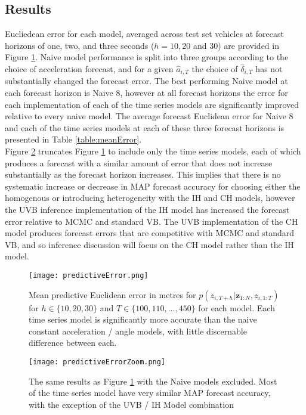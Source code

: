 \documentclass[12pt,a4paper]{article}\usepackage[]{graphicx}\usepackage[]{color}
\begin{document}
\subsection{Results}
\label{subsec:Results}

Eucliedean error for each model, averaged across test set vehicles at forecast horizons of one, two, and three seconds ($h = 10, 20$ and $30$) are provided in Figure \ref{fig:PredError}. Naive model performance is split into three groups according to the choice of acceleration forecast, and for a given $\hat{a}_{i, T}$ the choice of $\hat{\delta}_{i, T}$ has not substantially changed the forecast error. The best performing Naive model at each forecast horizon is Naive 8, however at all forecast horizons the error for each implementation of each of the time series models are significantly improved relative to every naive model. The average forecast Euclidean error for Naive 8 and each of the time series models at each of these three forecast horizons is presented in Table \ref{table:meanError}.
\\

Figure \ref{fig:PredErrorZ} truncates Figure \ref{fig:PredError} to include only the time series models, each of which produces a forecast with a similar amount of error that does not increase substantially as the forecast horizon increases. This implies that there is no systematic increase or decrease in MAP forecast accuracy for choosing either the homogenous or introducing heterogeneity with the IH and CH models, however the UVB inference implementation of the IH model has increased the forecast error relative to MCMC and standard VB. The UVB implementation of the CH model produces forecast errors that are competitive with MCMC and standard VB, and so inference discussion will focus on the CH model rather than the IH model. 
\\

\begin{figure}[ht]
\centering
\texttt{[image: predictiveError.png]}
\caption{Mean predictive Euclidean error in metres for $p(z_{i, T+h} | \textbf{z}_{1:N}, z_{i, 1:T})$ for $h \in \{10, 20, 30\}$ and $T \in \{100, 110, \dots, 450\}$ for each model. Each time series model is significantly more accurate than the naive constant acceleration / angle models, with little discernable difference between each.}
\label{fig:PredError}
\end{figure}

\begin{figure}[ht]
\centering
\texttt{[image: predictiveErrorZoom.png]}
\caption{The same results as Figure \ref{fig:PredError} with the Naive models excluded. Most of the time series model have very similar MAP forecast accuracy, with the exception of the UVB / IH Model combination}
\label{fig:PredErrorZ}
\end{figure}
\end{document}
